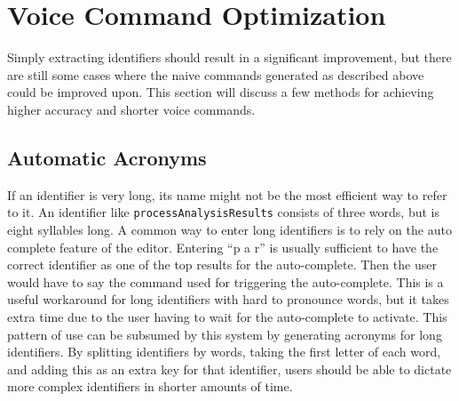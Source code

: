 \documentclass[../thesis.tex]{subfiles}
\begin{document}


\section{Voice Command Optimization}
Simply extracting identifiers should result in a significant improvement, but there are still some cases
where the naive commands generated as described above could be improved upon.
This section will discuss a few methods for achieving higher accuracy and shorter voice commands.

\subsection{Automatic Acronyms}\label{automatic_acronyms}
If an identifier is very long, its name might not be the most efficient way to refer to it.
An identifier like \texttt{processAnalysisResults} consists of three words, but is eight syllables long.
A common way to enter long identifiers is to rely on the auto complete feature of the editor.
Entering ``p a r'' is usually sufficient to have the correct identifier as one of the top results for the auto-complete.
Then the user would have to say the command used for triggering the auto-complete.
This is a useful workaround for long identifiers with hard to pronounce words, but it takes extra time
due to the user having to wait for the auto-complete to activate.
This pattern of use can be subsumed by this system by generating acronyms for long identifiers.
By splitting identifiers by words, taking the first letter of each word, and adding this as an extra key
for that identifier, users should be able to dictate more complex identifiers in shorter amounts of time.
\end{document}
